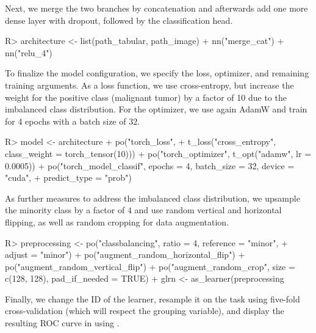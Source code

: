 \documentclass[article]{jss}
\theoremstyle{definition}
\begin{document}
Next, we merge the two branches by concatenation and afterwards add one more dense layer with dropout, followed by the classification head.

\begin{CodeInput}
R> architecture <- list(path_tabular, path_image) %
+    nn("merge_cat") %
+    nn("relu_4") %
\end{CodeInput}

To finalize the model configuration, we specify the loss, optimizer, and remaining training arguments.
As a loss function, we use cross-entropy, but increase the weight for the positive class (malignant tumor) by a factor of 10 due to the imbalanced class distribution.
For the optimizer, we use again AdamW and train for 4 epochs with a batch size of $32$.

\begin{CodeInput}
R> model <- architecture %
+    po("torch_loss",
+      t_loss("cross_entropy", class_weight = torch_tensor(10))) %
+    po("torch_optimizer", t_opt("adamw", lr = 0.0005)) %
+    po("torch_model_classif", epochs = 4, batch_size = 32, device = "cuda",
+      predict_type = "prob")
\end{CodeInput}

As further measures to address the imbalanced class distribution, we upsample the minority class by a factor of $4$ and use random vertical and horizontal flipping, as well as random cropping for data augmentation.

\begin{CodeInput}
R> preprocessing <- po("classbalancing", ratio = 4, reference = "minor",
+      adjust = "minor") %
+    po("augment_random_horizontal_flip") %
+    po("augment_random_vertical_flip") %
+    po("augment_random_crop", size = c(128, 128), pad_if_needed = TRUE)
+  glrn <- as_learner(preprocessing %
\end{CodeInput}

Finally, we change the ID of the learner, resample it on the task using five-fold cross-validation (which will respect the grouping variable), and display the resulting ROC curve in  using  \citep{ref-mlr3viz2025}.

\end{document}
